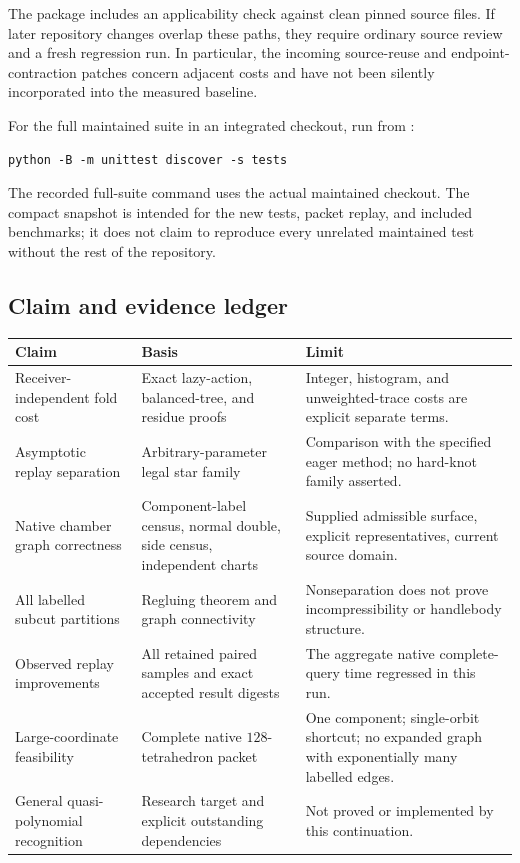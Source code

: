The package includes an applicability check against clean pinned source
files. If later repository changes overlap these paths, they require
ordinary source review and a fresh regression run. In particular, the
incoming source-reuse and endpoint-contraction patches concern adjacent
costs and have not been silently incorporated into the measured baseline.

For the full maintained suite in an integrated checkout, run from
:

\begin{lstlisting}
python -B -m unittest discover -s tests
\end{lstlisting}

The recorded full-suite command uses the actual maintained checkout.
The compact snapshot is intended for the new tests, packet replay, and
included benchmarks; it does not claim to reproduce every unrelated
maintained test without the rest of the repository.

\subsection{Claim and evidence ledger}

\begin{longtable}{L{0.30\textwidth}L{0.34\textwidth}L{0.28\textwidth}}
\toprule
Claim & Basis & Limit\\
\midrule
\endhead
Receiver-independent fold cost &
Exact lazy-action, balanced-tree, and residue proofs &
Integer, histogram, and unweighted-trace costs are explicit separate terms.\\
\addlinespace
Asymptotic replay separation &
Arbitrary-parameter legal star family &
Comparison with the specified eager method; no hard-knot family asserted.\\
\addlinespace
Native chamber graph correctness &
Component-label census, normal double, side census, independent charts &
Supplied admissible surface, explicit representatives, current source domain.\\
\addlinespace
All labelled subcut partitions &
Regluing theorem and graph connectivity &
Nonseparation does not prove incompressibility or handlebody structure.\\
\addlinespace
Observed replay improvements &
All retained paired samples and exact accepted result digests &
The aggregate native complete-query time regressed in this run.\\
\addlinespace
Large-coordinate feasibility &
Complete native \(128\)-tetrahedron packet &
One component; single-orbit shortcut; no expanded graph with exponentially
many labelled edges.\\
\addlinespace
General quasi-polynomial recognition &
Research target and explicit outstanding dependencies &
Not proved or implemented by this continuation.\\
\bottomrule
\end{longtable}

